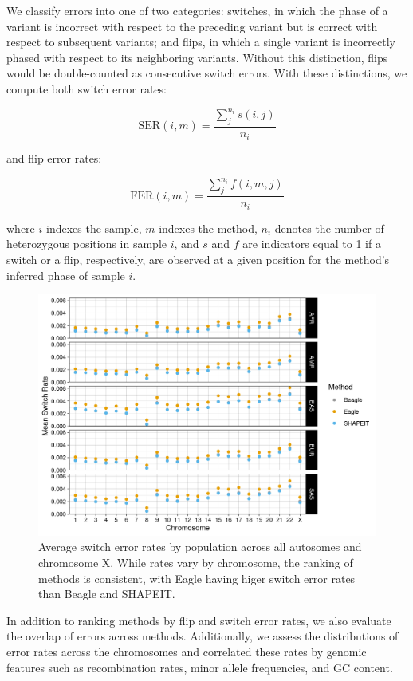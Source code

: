 We classify errors into one of two categories: switches, in which the phase of a variant is incorrect with respect to the preceding variant but is correct with respect to subsequent variants; and flips, in which a single variant is incorrectly phased with respect to its neighboring variants. Without this distinction, flips would be double-counted as consecutive switch errors. With these distinctions, we compute both switch error rates:

\begin{equation}
    \textrm{SER}(i, m) = \frac{\sum_j^{n_i} s(i, j)}{n_i}
\end{equation}

and flip error rates:

\begin{equation}
    \textrm{FER}(i, m) = \frac{\sum_j^{n_i} f(i, m, j)}{n_i}
\end{equation}

where $i$ indexes the sample, $m$ indexes the method, $n_i$ denotes the number of heterozygous positions in sample $i$, and $s$ and $f$ are indicators equal to 1 if a switch or a flip, respectively, are observed at a given position for the method's inferred phase of sample $i$.

\begin{figure}
    \centering
    \includegraphics[scale=0.80]{chapters/figures/switch_error_rates_all.png}
    \caption{Average switch error rates by population across all autosomes and chromosome X. While rates vary by chromosome, the ranking of methods is consistent, with Eagle having higer switch error rates than Beagle and SHAPEIT.}
    \label{fig:switch_err}
\end{figure}

In addition to ranking methods by flip and switch error rates, we also evaluate the overlap of errors across methods. Additionally, we assess the distributions of error rates across the chromosomes and correlated these rates by genomic features such as recombination rates, minor allele frequencies, and GC content.